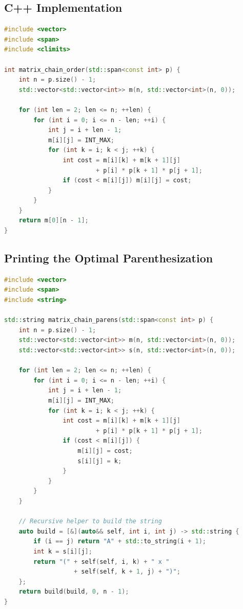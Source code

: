 \subsection{C++ Implementation}

\begin{lstlisting}[language=C++]
#include <vector>
#include <span>
#include <climits>

int matrix_chain_order(std::span<const int> p) {
    int n = p.size() - 1;
    std::vector<std::vector<int>> m(n, std::vector<int>(n, 0));

    for (int len = 2; len <= n; ++len) {
        for (int i = 0; i <= n - len; ++i) {
            int j = i + len - 1;
            m[i][j] = INT_MAX;
            for (int k = i; k < j; ++k) {
                int cost = m[i][k] + m[k + 1][j]
                         + p[i] * p[k + 1] * p[j + 1];
                if (cost < m[i][j]) m[i][j] = cost;
            }
        }
    }
    return m[0][n - 1];
}
\end{lstlisting}

\subsection{Printing the Optimal Parenthesization}

\begin{lstlisting}[language=C++]
#include <vector>
#include <span>
#include <string>

std::string matrix_chain_parens(std::span<const int> p) {
    int n = p.size() - 1;
    std::vector<std::vector<int>> m(n, std::vector<int>(n, 0));
    std::vector<std::vector<int>> s(n, std::vector<int>(n, 0));

    for (int len = 2; len <= n; ++len) {
        for (int i = 0; i <= n - len; ++i) {
            int j = i + len - 1;
            m[i][j] = INT_MAX;
            for (int k = i; k < j; ++k) {
                int cost = m[i][k] + m[k + 1][j]
                         + p[i] * p[k + 1] * p[j + 1];
                if (cost < m[i][j]) {
                    m[i][j] = cost;
                    s[i][j] = k;
                }
            }
        }
    }

    // Recursive helper to build the string
    auto build = [&](auto&& self, int i, int j) -> std::string {
        if (i == j) return "A" + std::to_string(i + 1);
        int k = s[i][j];
        return "(" + self(self, i, k) + " x "
                   + self(self, k + 1, j) + ")";
    };
    return build(build, 0, n - 1);
}
\end{lstlisting}

